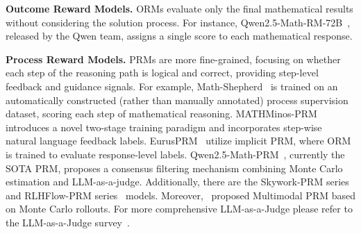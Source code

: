 \textbf{Outcome Reward Models.} ORMs evaluate only the final mathematical results without considering the solution process. For instance, Qwen2.5-Math-RM-72B~\cite{zhang2025lessons}, released by the Qwen team, assigns a single score to each mathematical response.

\textbf{Process Reward Models.} PRMs are more fine-grained, focusing on whether each step of the reasoning path is logical and correct, providing step-level feedback and guidance signals. For example, Math-Shepherd~\cite{wang2024math} is trained on an automatically constructed (rather than manually annotated) process supervision dataset, scoring each step of mathematical reasoning. MATHMinos-PRM~\cite{gao2024llm} introduces a novel two-stage training paradigm and incorporates step-wise natural language feedback labels. EurusPRM~\cite{cui2025process} utilize implicit PRM, where ORM is trained to evaluate response-level labels. Qwen2.5-Math-PRM~\cite{zhang2025lessons}, currently the SOTA PRM, proposes a consensus filtering mechanism combining Monte Carlo estimation and LLM-as-a-judge. Additionally, there are the Skywork-PRM series~\cite{skyworkopeno12024} and RLHFlow-PRM series~\cite{wei2024implementation} models. Moreover,~\citet{liu2024diving} proposed Multimodal PRM based on Monte Carlo rollouts. For more comprehensive LLM-as-a-Judge please refer to the LLM-as-a-Judge survey~\cite{gu2024survey}.